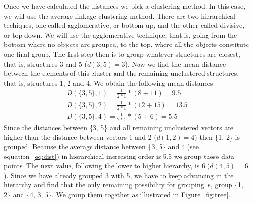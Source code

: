 Once we have calculated the distances we pick a clustering method.  In
this case,  we will use  the average linkage clustering  method. There
are   two  hierarchical  techiques,   one  called   agglomerative,  or
bottom-up, and the other called divisive, or top-down. We will use the
agglomerative  technique, that  is,  going from  the  bottom where  no
objects are grouped, to the  top, where all the objects constitute one
final group. The  first step then is to  group whatever structures are
closest, that  is, structures 3 and  5 ($d(3, 5)=3$). Now  we find the
mean distance between  the elements of this cluster  and the remaining
unclustered structures, that is, structures  1, 2 and 4. We obtain the
following mean distances
\begin{gather}
D(\{3,5\}, 1)=\frac{1}{2*1}*(8+11) = 9.5 \\
D(\{3,5\}, 2)=\frac{1}{2*1}*(12+15) = 13.5\\
D(\{3,5\}, 4)=\frac{1}{2*1}*(5+6) = 5.5 \label{eq:dist}
\end{gather}
Since  the distances between  \{3, 5\}  and all  remaining unclustered
vectors are  higher than the distance  between vectors 1  and 2 ($d(1,
2)=4$) then \{1, 2\} is  grouped. Because the average distance between
\{3, 5\} and 4 (see equation~\ref{eq:dist}) in hierarchical increasing
order is 5.5 we group these data points. The next value, following the
lower to higher  hierarchy, is 6 ($d(4, 5)=6$).  Since we have already
grouped 3 with 5, we have  to keep advancing in the hierarchy and find
that the  only remaining possibility  for grouping is, group  \{1, 2\}
and  \{4,   3,  5\}.  We   group  them  together  as   illustrated  in
Figure~\ref{fig:tree}.
